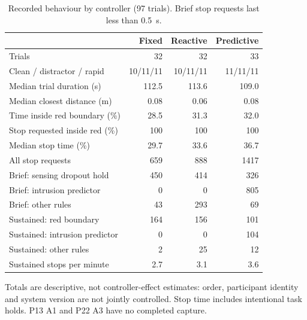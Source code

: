 \begin{table}[!t]
\centering
\caption{Recorded behaviour by controller (97 trials). Brief stop requests last less than 0.5~s.}
\label{tab:controllers}
\footnotesize
\begin{tabular}{@{}lrrr@{}}
\toprule
 & Fixed & Reactive & Predictive \\
\midrule
Trials & 32 & 32 & 33 \\
Clean / distractor / rapid & 10/11/11 & 10/11/11 & 11/11/11 \\
Median trial duration (s) & 112.5 & 113.6 & 109.0 \\
Median closest distance (m) & 0.08 & 0.06 & 0.08 \\
Time inside red boundary (\%) & 28.5 & 31.3 & 32.0 \\
Stop requested inside red (\%) & 100 & 100 & 100 \\
Median stop time (\%) & 29.7 & 33.6 & 36.7 \\
All stop requests & 659 & 888 & 1417 \\
\quad Brief: sensing dropout hold & 450 & 414 & 326 \\
\quad Brief: intrusion predictor & 0 & 0 & 805 \\
\quad Brief: other rules & 43 & 293 & 69 \\
\quad Sustained: red boundary & 164 & 156 & 101 \\
\quad Sustained: intrusion predictor & 0 & 0 & 104 \\
\quad Sustained: other rules & 2 & 25 & 12 \\
Sustained stops per minute & 2.7 & 3.1 & 3.6 \\
\bottomrule
\end{tabular}
\par\smallskip\begin{minipage}{\linewidth}\footnotesize Totals are descriptive, not controller-effect estimates: order, participant identity and system version are not jointly controlled. Stop time includes intentional task holds. P13 A1 and P22 A3 have no completed capture.\end{minipage}
\end{table}
